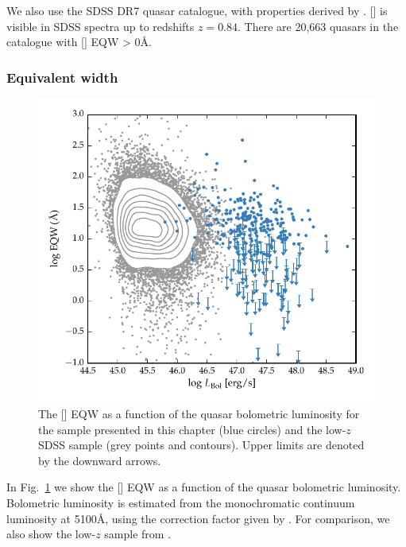 We also use the SDSS DR7 quasar catalogue, with properties derived by \citet{shen11}. 
[] is visible in SDSS spectra up to redshifts $z=0.84$. 
There are 20,663 quasars in the \citet{shen11} catalogue with [] EQW > 0\AA. 

\subsubsection{Equivalent width}

\begin{figure}[t!]
    \includegraphics[width=\columnwidth]{figures/chapter04/eqw_lum.pdf} 
    \caption[{The [] EQW as a function of the quasar bolometric luminosity for the sample presented in this chapter (blue circles) and the low-$z$ SDSS sample (grey points and contours).}]{The [] EQW as a function of the quasar bolometric luminosity for the sample presented in this chapter (blue circles) and the low-$z$ SDSS sample (grey points and contours). Upper limits are denoted by the downward arrows. }     
    \label{fig:eqw_lum}
\end{figure}

In Fig.~\ref{fig:eqw_lum} we show the [] EQW as a function of the quasar bolometric luminosity. 
Bolometric luminosity is estimated from the monochromatic continuum luminosity at 5100\AA, using the correction factor given by \citet{richards06}. 
For comparison, we also show the low-$z$ sample from \citet{shen11}.  

